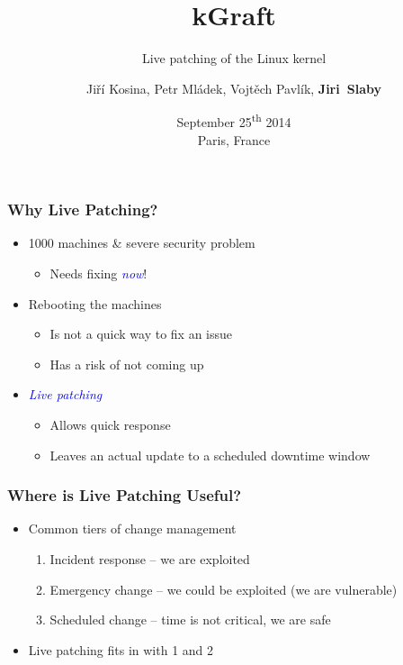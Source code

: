 \documentclass[xcolor=dvipsnames,handout]{beamer}
\title{kGraft}
\subtitle{Live patching of the Linux kernel}
\date[September 25\textsuperscript{th} 2014, Paris]{September
25\textsuperscript{th} 2014 \\ Paris, France}
\author[Jiri~Slaby]{Jiří Kosina, Petr Mládek, Vojtěch Pavlík, \textbf{Jiri~Slaby}}
\institute{SUSE Labs}
\let\Oldemph\emph
\renewcommand{\emph}[1]{\textcolor{blue}{\Oldemph{#1}}}
\begin{document}
\begin{frame}
  \titlepage
\end{frame}


\begin{frame}
  \frametitle{Why Live Patching?}

  \begin{itemize}
    \item 1000 machines \& severe security problem
    \begin{itemize}
      \item Needs fixing \emph{now}!
    \end{itemize}

    \pause

    \item Rebooting the machines
    \begin{itemize}
      \item Is not a quick way to fix an issue
      \item Has a risk of not coming up
    \end{itemize}

    \pause

    \item \emph{Live patching}
    \begin{itemize}
      \item Allows quick response
      \item Leaves an actual update to a scheduled downtime window
    \end{itemize}

  \end{itemize}

\end{frame}

\begin{frame}
  \frametitle{Where is Live Patching Useful?}

  \begin{itemize}
    \item Common tiers of change management
    \begin{enumerate}
      \item Incident response -- we are exploited
      \item Emergency change -- we could be exploited (we are vulnerable)
      \item Scheduled change -- time is not critical, we are safe
    \end{enumerate}

    \pause

    \item Live patching fits in with 1 and 2

  \end{itemize}

\end{frame}
\end{document}

